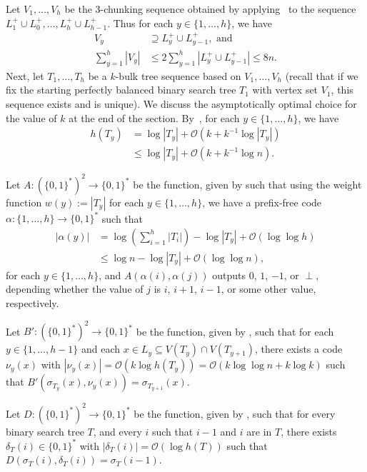 \documentclass[kpfonts]{patmorin}
\newcommand{\Oh}{\mathcal{O}}
\let\le\leqslant
\let\leq\leqslant
\begin{document}
Let $V_1,\dots,V_{h}$ be the $3$-chunking sequence obtained by applying~ to the sequence $L^+_{1}\cup L^+_{0}, \dots, L^+_{h}\cup L^+_{h-1}$. Thus for each $y\in\{1,\dots,h\}$, we have
\begin{align*}
V_y&\supseteq L^+_{y}\cup L^+_{y-1}, \textrm{ and}\\
\textstyle\sum_{y=1}^h |V_y|&\le 2\textstyle\sum_{y=1}^h |L^+_{y}\cup L^+_{y-1}|\leq 8n.
\end{align*}
Next, let $T_1,\dots,T_h$ be a $k$-bulk tree sequence based on $V_1,\dots,V_{h}$ (recall that if we fix the starting perfectly balanced binary search tree $T_1$ with vertex set $V_1$, this sequence exists and is unique).
We discuss the asymptotically optimal choice for the value of $k$ at the end of the section.
By~, for each $y\in\{1,\dots,h\}$, we have
\begin{align*}
h(T_y)&=\log|T_y| + \Oh(k+k^{-1}\log |T_y|)\\
&\leq\log|T_y| + \Oh(k+k^{-1}\log n).
\end{align*}

Let $A:(\{0,1\}^{*})^2\to\{0,1\}^*$ be the function, given by  such that
using the weight function $w(y):=|T_y|$ for each $y\in\{1,\dots,h\}$,
we have a prefix-free code $\alpha:\{1,\dots,h\}\to\{0,1\}^*$ such that
\begin{align*}
|\alpha(y)|&=\log\left(\textstyle\sum_{i=1}^h|T_i|\right) - \log|T_y| + \Oh(\log\log h)\\
&\leq \log n - \log|T_y| + \Oh(\log\log n),
\end{align*}
for each $y\in\{1,\dots,h\}$, and $A(\alpha(i),\alpha(j))$ outputs $0$, $1$, $-1$, or $\perp$, depending whether the value of $j$ is $i$, $i+1$, $i-1$, or some other value, respectively.


Let $B':(\{0,1\}^{*})^2\to\{0,1\}^*$ be the function, given by , such that
for each $y\in\{1,\dots,h-1\}$ and each $x\in L_{y}\subseteq V(T_y)\cap V(T_{y+1})$,
there exists a code $\nu_{y}(x)$ with $|\nu_{y}(x)|=\Oh(k\log h(T_{y}))=\Oh(k\log\log n+k \log k)$ such that $B'(\sigma_{T_{y}}(x),\nu_{y}(x))=\sigma_{T_{y+1}}(x)$.

Let $D:(\{0,1\}^{*})^2\to\{0,1\}^*$ be the function, given by , such that for every binary search tree $T$, and every $i$ such that $i-1$ and $i$ are in $T$, there exists $\delta_T(i) \in \{0,1\}^*$ with $|\delta_T(i)|=\Oh(\log h(T))$ such that
$D(\sigma_T(i),\delta_T(i))=\sigma_T(i-1)$.
\end{document}
